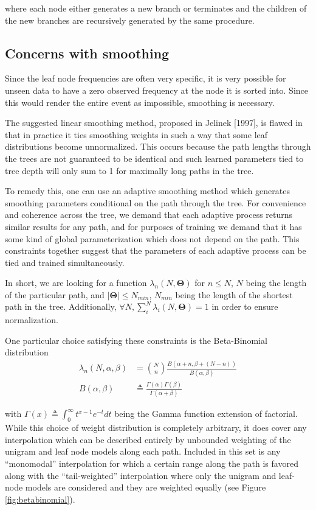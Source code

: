 \documentclass[12pt]{article}
\begin{document}
where each node either generates a new branch or terminates and the
children of the new branches are recursively generated by the same
procedure.

\subsection{Concerns with smoothing}

Since the leaf node frequencies are often very specific, it is very
possible for unseen data to have a zero observed frequency at the node
it is sorted into. Since this would render the entire event as
impossible, smoothing is necessary.

The suggested linear smoothing method, proposed in Jelinek [1997], is
flawed in that in practice it ties smoothing weights in such a way
that some leaf distributions become unnormalized. This occurs because
the path lengths through the trees are not guaranteed to be identical
and such learned parameters tied to tree depth will only sum to 1 for
maximally long paths in the tree.

To remedy this, one can use an adaptive smoothing method which
generates smoothing parameters conditional on the path through the
tree. For convenience and coherence across the tree, we demand that
each adaptive process returns similar results for any path, and for
purposes of training we demand that it has some kind of global
parameterization which does not depend on the path. This constraints
together suggest that the parameters of each adaptive process can be
tied and trained simultaneously.

In short, we are looking for a function $\lambda_n(N,
\mathbf{\Theta})$ for $n \le N$, $N$ being the length of the
particular path, and $|\mathbf{\Theta}| \le N_{min}$, $N_{min}$ being
the length of the shortest path in the tree. Additionally, $\forall N,
\sum_i^N \lambda_i(N, \mathbf{\Theta}) = 1$ in order to ensure
normalization.

One particular choice satisfying these constraints is the
Beta-Binomial distribution
\begin{align}
  \lambda_n(N, \alpha, \beta) 
  &= {N \choose n} \frac{B(\alpha + n, \beta + (N-n))}{B(\alpha, \beta)} \\
  B(\alpha, \beta) 
  &\triangleq \frac{\Gamma(\alpha)\Gamma(\beta)}{\Gamma(\alpha + \beta)}
\end{align}

with $\Gamma(x) \triangleq \int_0^\infty t^{x-1} e^{-t} dt$ being the
Gamma function extension of factorial. While this choice of weight
distribution is completely arbitrary, it does cover any interpolation
which can be described entirely by unbounded weighting of the unigram
and leaf node models along each path. Included in this set is any
``monomodal'' interpolation for which a certain range along the path
is favored along with the ``tail-weighted'' interpolation where only
the unigram and leaf-node models are considered and they are weighted
equally (see Figure \ref{fig:betabinomial}).
\end{document}
